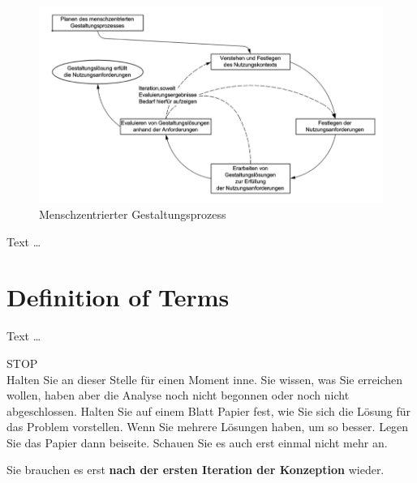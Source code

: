 \documentclass[11pt,a4paper,english]{scrreprt}
\newenvironment{comment}
  {\par\medskip
   \begingroup\color{olive}%
   }
 {\endgroup
  \medskip}
\begin{document}
\begin{figure}[htbp]
    \centering
    \includegraphics[width=\textwidth]{img/Picture1.png}
    \caption{Menschzentrierter Gestaltungsprozess \parencite{DIN}}
    \label{fig:picture1}
\end{figure}

Text \dots

\section{Definition of Terms}
Text \dots

\clearpage
\begin{comment}
\begin{center}
\huge
STOP\\
\normalsize
Halten Sie an dieser Stelle für einen Moment inne. Sie wissen, was Sie erreichen wollen, haben aber die Analyse noch nicht begonnen oder noch nicht abgeschlossen. Halten Sie auf einem Blatt Papier fest, wie Sie sich die Lösung für das Problem vorstellen. Wenn Sie mehrere Lösungen haben, um so besser. Legen Sie das Papier dann beiseite. Schauen Sie es auch erst einmal nicht mehr an.

Sie brauchen es erst \textbf{nach der ersten Iteration der Konzeption} wieder.
\end{center}
\end{comment}

\newpage
\end{document}
